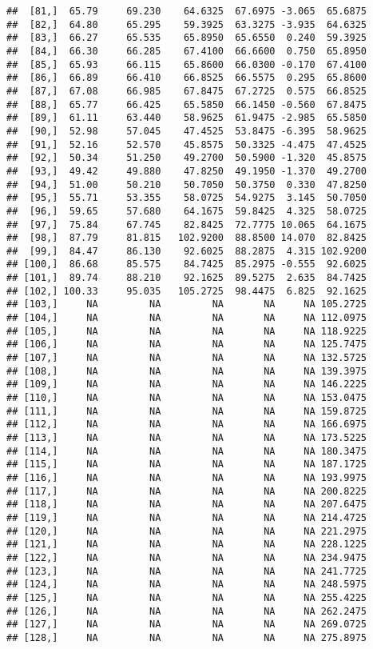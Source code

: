 \documentclass[
]{article}
\begin{document}
\begin{verbatim}
##  [81,]  65.79     69.230    64.6325  67.6975 -3.065  65.6875
##  [82,]  64.80     65.295    59.3925  63.3275 -3.935  64.6325
##  [83,]  66.27     65.535    65.8950  65.6550  0.240  59.3925
##  [84,]  66.30     66.285    67.4100  66.6600  0.750  65.8950
##  [85,]  65.93     66.115    65.8600  66.0300 -0.170  67.4100
##  [86,]  66.89     66.410    66.8525  66.5575  0.295  65.8600
##  [87,]  67.08     66.985    67.8475  67.2725  0.575  66.8525
##  [88,]  65.77     66.425    65.5850  66.1450 -0.560  67.8475
##  [89,]  61.11     63.440    58.9625  61.9475 -2.985  65.5850
##  [90,]  52.98     57.045    47.4525  53.8475 -6.395  58.9625
##  [91,]  52.16     52.570    45.8575  50.3325 -4.475  47.4525
##  [92,]  50.34     51.250    49.2700  50.5900 -1.320  45.8575
##  [93,]  49.42     49.880    47.8250  49.1950 -1.370  49.2700
##  [94,]  51.00     50.210    50.7050  50.3750  0.330  47.8250
##  [95,]  55.71     53.355    58.0725  54.9275  3.145  50.7050
##  [96,]  59.65     57.680    64.1675  59.8425  4.325  58.0725
##  [97,]  75.84     67.745    82.8425  72.7775 10.065  64.1675
##  [98,]  87.79     81.815   102.9200  88.8500 14.070  82.8425
##  [99,]  84.47     86.130    92.6025  88.2875  4.315 102.9200
## [100,]  86.68     85.575    84.7425  85.2975 -0.555  92.6025
## [101,]  89.74     88.210    92.1625  89.5275  2.635  84.7425
## [102,] 100.33     95.035   105.2725  98.4475  6.825  92.1625
## [103,]     NA         NA         NA       NA     NA 105.2725
## [104,]     NA         NA         NA       NA     NA 112.0975
## [105,]     NA         NA         NA       NA     NA 118.9225
## [106,]     NA         NA         NA       NA     NA 125.7475
## [107,]     NA         NA         NA       NA     NA 132.5725
## [108,]     NA         NA         NA       NA     NA 139.3975
## [109,]     NA         NA         NA       NA     NA 146.2225
## [110,]     NA         NA         NA       NA     NA 153.0475
## [111,]     NA         NA         NA       NA     NA 159.8725
## [112,]     NA         NA         NA       NA     NA 166.6975
## [113,]     NA         NA         NA       NA     NA 173.5225
## [114,]     NA         NA         NA       NA     NA 180.3475
## [115,]     NA         NA         NA       NA     NA 187.1725
## [116,]     NA         NA         NA       NA     NA 193.9975
## [117,]     NA         NA         NA       NA     NA 200.8225
## [118,]     NA         NA         NA       NA     NA 207.6475
## [119,]     NA         NA         NA       NA     NA 214.4725
## [120,]     NA         NA         NA       NA     NA 221.2975
## [121,]     NA         NA         NA       NA     NA 228.1225
## [122,]     NA         NA         NA       NA     NA 234.9475
## [123,]     NA         NA         NA       NA     NA 241.7725
## [124,]     NA         NA         NA       NA     NA 248.5975
## [125,]     NA         NA         NA       NA     NA 255.4225
## [126,]     NA         NA         NA       NA     NA 262.2475
## [127,]     NA         NA         NA       NA     NA 269.0725
## [128,]     NA         NA         NA       NA     NA 275.8975
\end{verbatim}
\end{document}
